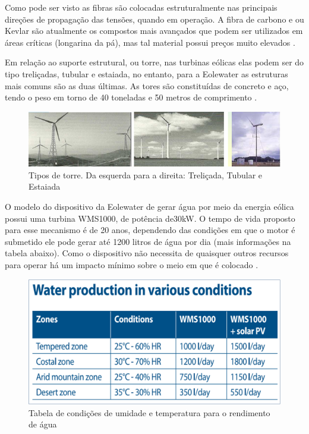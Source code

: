 Como pode ser visto as fibras são colocadas estruturalmente nas principais direções de propagação das tensões, quando 
em operação. A fibra de carbono e ou Kevlar são atualmente os compostos mais avançados que podem ser utilizados em áreas
críticas (longarina da pá), mas tal material possui preços muito elevados \cite{barrosVarela}.  

Em relação ao suporte estrutural, ou torre, nas turbinas eólicas elas podem ser do tipo treliçadas, tubular e estaiada,
no entanto, para a Eolewater as estruturas mais comuns são as duas últimas. As tores são constituídas de concreto e aço,
tendo o peso em torno de 40 toneladas e 50 metros de comprimento \cite{usp}.

\begin{figure}[!htb]
\centering
\includegraphics[scale=0.80]{editaveis/figuras/torre}
\caption[Tipos de torre]{Tipos de torre. Da esquerda para a direita: Treliçada, Tubular e Estaiada \footnotemark}
\FloatBarrier
\label{torre}
\end{figure}

O modelo do dispositivo da Eolewater de gerar água por meio da energia eólica possui uma turbina WMS1000, de potência de30kW.
O tempo de vida proposto para esse mecanismo é de 20 anos, dependendo das condições em que o motor é submetido ele pode gerar
até 1200 litros de água por dia (mais informações na tabela abaixo). Como o dispositivo não necessita de quaisquer outros 
recursos para operar há um impacto mínimo sobre o meio em que é colocado \cite{renewable}.

\begin{figure}[!htbp]
\centering
\includegraphics[scale=0.3]{editaveis/figuras/condicoes}
\caption[Tabela de condições de umidade e temperatura para o rendimento de água]{Tabela de condições de umidade e temperatura para o rendimento de água \footnotemark}
\FloatBarrier
\label{condicoes}
\end{figure}

